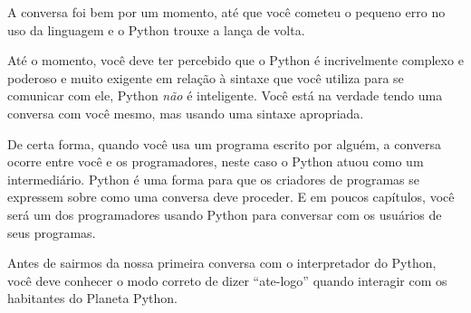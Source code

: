 
A conversa foi bem por um momento, até que você cometeu o 
pequeno erro no uso da linguagem e o Python trouxe a lança
de volta.
%

Até o momento, você deve ter percebido que o Python
é incrivelmente complexo e poderoso e muito exigente em relação
à sintaxe que você utiliza para se comunicar com ele, Python {\em não}
é inteligente. Você está na verdade tendo uma conversa com você mesmo,
mas usando uma sintaxe apropriada.
%

De certa forma, quando você usa um programa escrito por alguém,
a conversa ocorre entre você e os programadores, neste caso o Python 
atuou como um intermediário. Python é uma forma para que os criadores de
programas se expressem sobre como uma conversa deve proceder. E em poucos
capítulos, você será um dos programadores usando Python para conversar com 
os usuários de seus programas.
%

Antes de sairmos da nossa primeira conversa com o interpretador
do Python, você deve conhecer o modo correto de dizer ``ate-logo''
quando interagir com os habitantes do Planeta Python.
%

